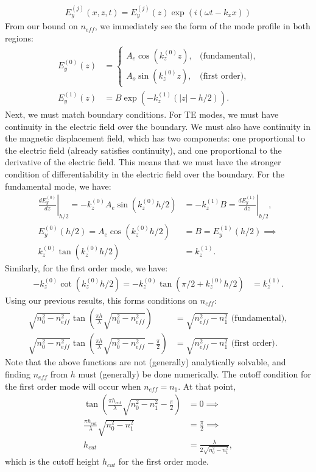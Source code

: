 \documentclass[10pt, letter, oneside,graphicx]{article}
\begin{document}
\begin{align*}
E_y^{(j)}(x,z,t) = E_y^{(j)}(z)\exp(i(\omega t - k_xx))
\end{align*}
From our bound on $n_{eff}$, we immediately see the form of the mode profile in both regions:
\begin{align*}
E_y^{(0)}(z) &= 
\left\{
\begin{array}{ll}
A_e\cos(k_z^{(0)}z), & \text{(fundamental)}, \\
A_o\sin(k_z^{(0)}z), & \text{(first order)},
\end{array}
\right. \\
E_y^{(1)}(z) &= B\exp(-k_z^{(1)}(|z| - h/2)).
\end{align*}
Next, we must match boundary conditions. For TE modes, we must have continuity in the electric field over the boundary. We must also have continuity in the magnetic displacement field, which has two components: one proportional to the electric field (already satisfies continuity), and one proportional to the derivative of the electric field. This means that we must have the stronger condition of differentiability in the electric field over the boundary.
For the fundamental mode, we have:
\begin{align*}
\left. \frac{dE_y^{(0)}}{dz} \right|_{h/2} = -k_z^{(0)}A_e\sin(k_z^{(0)}h/2) &= -k_z^{(1)}B = \left. \frac{dE_y^{(1)}}{dz} \right|_{h/2}, \\
E_y^{(0)}(h/2) = A_e\cos(k_z^{(0)}h/2) &= B = E_y^{(1)}(h/2) \implies \\
k_z^{(0)}\tan(k_z^{(0)}h/2) &= k_z^{(1)}.
\end{align*}
Similarly, for the first order mode, we have:
\begin{align*}
-k_z^{(0)}\cot(k_z^{(0)}h/2) = -k_z^{(0)}\tan(\pi/2 + k_z^{(0)}h/2) &= k_z^{(1)}.
\end{align*}
Using our previous results, this forms conditions on $n_{eff}$:
\begin{align*}
\sqrt{ n_0^2 - n_{eff}^2 }\tan(\frac{\pi h}{\lambda}\sqrt{ n_0^2 - n_{eff}^2 }) &= \sqrt{ n_{eff}^2 - n_1^2 } \text{ (fundamental)}, \\
\sqrt{ n_0^2 - n_{eff}^2 }\tan(\frac{\pi h}{\lambda}\sqrt{ n_0^2 - n_{eff}^2 } - \frac{\pi}{2}) &= \sqrt{ n_{eff}^2 - n_1^2 } \text{ (first order)}.
\end{align*}
Note that the above functions are not (generally) analytically solvable, and finding $n_{eff}$ from $h$ must (generally) be done numerically.
The cutoff condition for the first order mode will occur when $n_{eff} = n_1$. At that point,
\begin{align*}
\tan(\frac{\pi h_{cut}}{\lambda}\sqrt{ n_0^2 - n_1^2 } - \frac{\pi}{2}) &= 0 \implies \\
\frac{\pi h_{cut}}{\lambda}\sqrt{ n_0^2 - n_1^2 } &= \frac{\pi}{2} \implies \\
h_{cut} &= \frac{\lambda}{2\sqrt{ n_0^2 - n_1^2 }},
\end{align*}
which is the cutoff height $h_{cut}$ for the first order mode.
\end{document}
